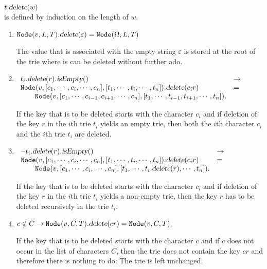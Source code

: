 \hspace*{1.3cm} 
$t.\textsl{delete}(w)$
\\[0.2cm]
is defined by induction on the length of  $w$.
\begin{enumerate}
\item $\texttt{Node}(v,L,T).\textsl{delete}(\varepsilon) = \texttt{Node}(\Omega,L,T)$

      The value that is associated with the empty  string $\varepsilon$ is stored at the root of the
      trie where is can be deleted without further ado.
\item $\begin{array}[t]{ll}
       t_i.\textsl{delete}(r).\textsl{isEmpty}()   & \rightarrow \\
       \texttt{Node}(v, [c_1,\cdots,c_i,\cdots,c_n],[t_1,\cdots,t_i,\cdots,t_n]).\textsl{delete}(c_ir) 
       & = \\
       \qquad 
       \texttt{Node}(v, [c_1,\cdots,c_{i-1},c_{i+1},\cdots,c_n],[t_1,\cdots,t_{i-1},t_{i+1},\cdots,t_n]).
       \end{array}
       $

       If  the key that is to be deleted starts with the character $c_i$ and if deletion of  the key
       $r$ in the $i$th  trie $t_i$ yields an empty
       trie, then both the $i$th character $c_i$ and the $i$th trie $t_i$ are deleted.
\item $\begin{array}[t]{ll}
       \neg t_i.\textsl{delete}(r).\textsl{isEmpty}()   & \rightarrow \\
       \texttt{Node}(v, [c_1,\cdots,c_i,\cdots,c_n],[t_1,\cdots,t_i,\cdots,t_n]).\textsl{delete}(c_ir) 
       & = \\
       \qquad \texttt{Node}(v, [c_1,\cdots,c_i,\cdots,c_n],[t_1,\cdots,t_i.\textsl{delete}(r),\cdots,t_n]).
       \end{array}
       $

       If  the key that is to be deleted starts with the character $c_i$ and if deletion of  the key
       $r$ in the $i$th  trie $t_i$ yields a non-empty trie, then the key $r$ has to be deleted recursively
       in the trie $t_i$.
\item $c \notin C \rightarrow \texttt{Node}(v, C, T).\textsl{delete}(cr) =
       \texttt{Node}(v, C, T)$. 
       
       If  the key that is to be deleted starts with the character $c$ and if $c$ does not occur in
       the list of characters $C$, then the trie does not contain the key $cr$ and therefore there
       is nothing  to do:  The trie is left unchanged.
\end{enumerate}

